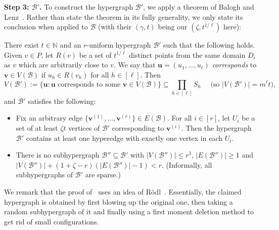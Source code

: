 \documentclass[11pt, a4paper]{article}
\newcounter{propcounter}
\newcommand{\V}[1]{\mathbold{#1}}
\theoremstyle{definition}
\newcommand{\cB}{\mathcal{B}}
\newcommand{\cG}{\mathcal{G}}
\begin{document}
\medskip
\noindent
\textbf{Step 3: $\cB'$.}		
To construct the hypergraph $\cB'$, we apply a theorem of Balogh and Lenz~\cite[Theorem~16]{BL-1}.
Rather than state the theorem in its fully generality, we only state its conclusion when applied to $\cB$ (with their $(\gamma, t)$ being our $(\zeta, t^{1/\ell})$ here):

There exist $t \in \mathbb{N}$ and an $r$-uniform hypergraph $\cB'$ such that the following holds.
Given $v \in P$, let $R(v)$ be a set of $t^{1/\ell}$ distinct points from the same domain $D_i$ as $v$ which are arbitrarily close to $v$.
We say that $\V{u} = (u_1,\ldots,u_{\ell})$ \emph{corresponds} to $\V{v} \in V(\cB)$ if $u_h \in R(v_h)$ for all $h \in [\ell]$. 
Then
$$
V(\cB') := \{\V{u} : \V{u} \text{ corresponds to some } \V{v} \in V(\cB)\} \subseteq \prod_{h \in [\ell]}S_h
\quad\text{ (so }|V(\cB')| = m^\ell t),
$$
and $\cB'$ satisfies the following:	
\begin{itemize}
	\item Fix an arbitrary edge $\lbrace \V{v}^{(1)},\ldots, \V{v}^{(r)}\rbrace\in E(\cB)$. For all $i\in [r]$, let $U_i$ be a set of at least $\zeta t$ vertices of $\cB'$ corresponding to $\V{v}^{(i)}$. Then the hypergraph $\cB'$ contains at least one hyperedge with exactly one vertex in each $U_i$. 
	\item There is no subhypergraph $\cB''\subseteq \cB'$ with $|V(\cB'')|\le r^3$, $|E(\cB'')| \geq 1$ and $|V(\cB'')|+(1+\zeta-r)(|E(\cB'')|-1)<r$. (Informally, all subhypergraphs of $\cB'$ are sparse.) 
\end{itemize}

We remark that the proof of~\cite[Theorem~16]{BL-1} uses an idea of R\"odl~\cite{Rodl}. Essentially, the claimed hypergraph is obtained by first blowing up the original one, then taking a random subhypergraph of it and finally using a first moment deletion method to get rid of small configurations.

\end{document}
